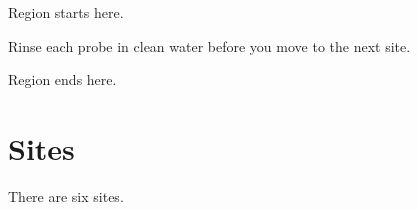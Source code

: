 \documentclass[11pt]{article}
\begin{document}
Region starts here.

\begin{tcolorbox}
Rinse each probe in clean water before you move to the next site.
\end{tcolorbox}

Region ends here.

\section{Sites}
There are six sites.
\end{document}
